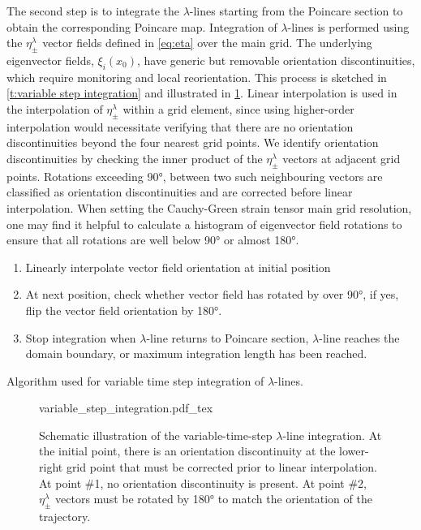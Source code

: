 \documentclass[5p]{elsarticle}
\begin{document}
The second step is to integrate the $\lambda$-lines  starting from the Poincare section to obtain the corresponding Poincare map. Integration of $\lambda$-lines is performed using the $\eta_\pm^\lambda$ vector fields defined in \cref{eq:eta} over the main grid. The underlying eigenvector fields, $\xi_i(x_0)$, have generic but removable orientation discontinuities, which require monitoring and local reorientation. This process is sketched in \cref{t:variable step integration} and illustrated in \cref{f:variable step integration}. Linear interpolation is used in the interpolation of $\eta_\pm^\lambda$ within a grid element, since using higher-order interpolation would necessitate verifying that there are no orientation discontinuities beyond the four nearest grid points. We identify orientation discontinuities by checking the inner product of the $\eta_\pm^\lambda$ vectors at adjacent grid points. Rotations exceeding 90°, between two such neighbouring vectors are classified as orientation discontinuities and are corrected before linear interpolation. When setting the Cauchy-Green strain tensor main grid resolution, one may find it helpful to calculate a histogram of eigenvector field rotations to ensure that all rotations are well below 90° or almost 180°.

\begin{table}
\begin{enumerate}
\item Linearly interpolate vector field orientation at initial position
\item At next position, check whether vector field has rotated by over 90°, if yes, flip the vector field orientation by 180°.
\item Stop integration when $\lambda$-line returns to Poincare section, $\lambda$-line reaches the domain boundary, or maximum integration length has been reached.
\end{enumerate}
\caption{Algorithm used for variable time step integration of $\lambda$-lines.}
\label{t:variable step integration}
\end{table}

\begin{figure}
\begin{center}
\def\svgwidth{.4\textwidth}
{variable_step_integration.pdf_tex}
\end{center}
\caption{Schematic illustration of the variable-time-step $\lambda$-line integration. At the initial point, there is an orientation discontinuity at the lower-right grid point that must be corrected prior to linear interpolation. At point \#1, no orientation discontinuity is present. At point \#2, $\eta_\pm^\lambda$ vectors must be rotated by 180° to match the orientation of the trajectory.}
\label{f:variable step integration}
\end{figure}
\end{document}
